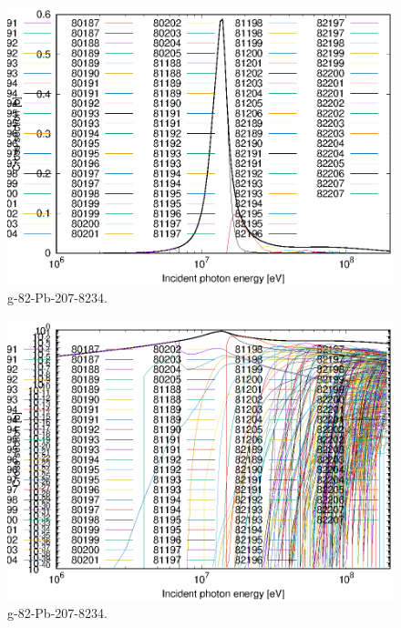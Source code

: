 \begin{figure}
 \includegraphics[width=\linewidth]{eps/g_82-Pb-207_8234.eps}
  \caption{g-82-Pb-207-8234.}
\end{figure}
\begin{figure}
 \includegraphics[width=\linewidth]{eps-log/g_82-Pb-207_8234.eps}
 \caption{g-82-Pb-207-8234.}
\end{figure}
\newpage \clearpage

